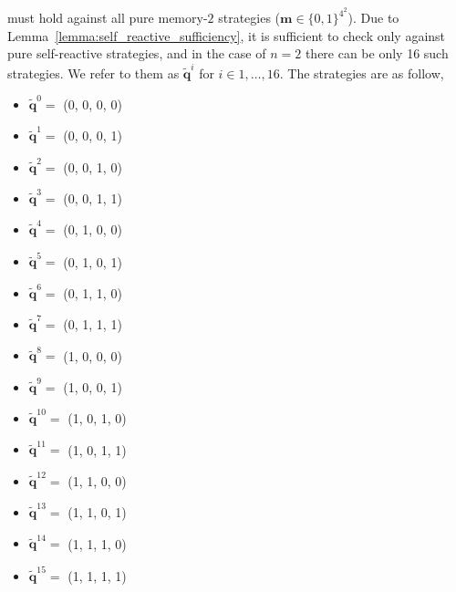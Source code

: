 \documentclass{article}
\theoremstyle{definition}
\begin{document}
must hold against all pure memory-\(2\) strategies (\(\mathbf{m} \in \{0, 1\}^{4
^ 2}\)). Due to Lemma~\ref{lemma:self_reactive_sufficiency}, it is sufficient to
check only against pure self-reactive strategies, and in the case of $n=2$ there
can be only 16 such strategies. We refer to them as $\mathbf{\tilde{q}}^{i}$ for
$i \in 1, \dots, 16$. The strategies are as follow,

\begin{multicols}{4}
  \begin{itemize}
    \item $\mathbf{\tilde{q}}^{0} =$ (0, 0, 0, 0)
    \item $\mathbf{\tilde{q}}^{1} =$ (0, 0, 0, 1)
    \item $\mathbf{\tilde{q}}^{2} =$ (0, 0, 1, 0)
    \item $\mathbf{\tilde{q}}^{3} =$ (0, 0, 1, 1)
    \item $\mathbf{\tilde{q}}^{4} =$ (0, 1, 0, 0)
    \item $\mathbf{\tilde{q}}^{5} =$ (0, 1, 0, 1)
    \item $\mathbf{\tilde{q}}^{6} =$ (0, 1, 1, 0)
    \item $\mathbf{\tilde{q}}^{7} =$ (0, 1, 1, 1)
    \item $\mathbf{\tilde{q}}^{8} =$ (1, 0, 0, 0)
    \item $\mathbf{\tilde{q}}^{9} =$ (1, 0, 0, 1)
    \item $\mathbf{\tilde{q}}^{10} =$ (1, 0, 1, 0)
    \item $\mathbf{\tilde{q}}^{11} =$ (1, 0, 1, 1)
    \item $\mathbf{\tilde{q}}^{12} =$ (1, 1, 0, 0)
    \item $\mathbf{\tilde{q}}^{13} =$ (1, 1, 0, 1)
    \item $\mathbf{\tilde{q}}^{14} =$ (1, 1, 1, 0)
    \item $\mathbf{\tilde{q}}^{15} =$ (1, 1, 1, 1)
  \end{itemize}
\end{multicols}
\end{document}
